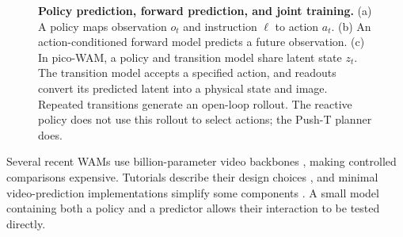 \documentclass[11pt]{article}
\begin{document}
\begin{figure}[!htbp]
\centering
{}
\caption{\textbf{Policy prediction, forward prediction, and joint training.} (a) A policy maps observation $o_t$ and instruction $\ell$ to action $a_t$. (b) An action-conditioned forward model predicts a future observation. (c) In pico-WAM, a policy and transition model share latent state $z_t$. The transition model accepts a specified action, and readouts convert its predicted latent into a physical state and image. Repeated transitions generate an open-loop rollout. The reactive policy does not use this rollout to select actions; the Push-T planner does.}
\label{fig:paradigms}
\end{figure}

Several recent WAMs use billion-parameter video backbones \citep{liao2025genie,kim2026cosmospolicy,li2026lingbotva}, making controlled comparisons expensive. Tutorials describe their design choices \citep{zhang2026tutorial}, and minimal video-prediction implementations simplify some components \citep{huang2026nano}. A small model containing both a policy and a predictor allows their interaction to be tested directly.
\end{document}
